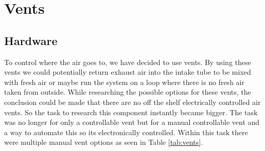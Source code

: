 \documentclass[a4paper,oneside]{book}
\begin{document}
\section{Vents}
\subsection{Hardware}
To control where the air goes to, we have decided to use vents. By using these
vents we could potentially return exhaust air into the intake tube to be mixed
with fresh air or maybe run the system on a loop where there is no fresh air
taken from outside. While researching the possible options for these vents, the
conclusion could be made that there are no off the shelf electrically
controlled air vents. So the task to research this component instantly became
bigger. The task was no longer for only a controllable vent but for a manual
controllable vent and a way to automate this so its electronically controlled.
Within this task there were multiple manual vent options as seen in Table
\ref{tab:vents}.
\end{document}
